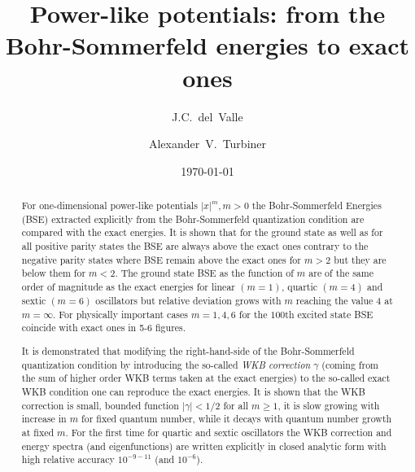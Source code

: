 \documentclass[preprint,preprintnumbers,amsmath,amssymb]{revtex4}
\begin{document}
\title{Power-like potentials: from the Bohr-Sommerfeld energies to exact ones}

\date{\today}

%
\author{J.C.~del~Valle}
%
\author{Alexander~V.~Turbiner}
%

\begin{abstract}
For one-dimensional power-like potentials $|x|^m, m > 0$ the Bohr-Sommerfeld Energies (BSE) extracted explicitly from the Bohr-Sommerfeld quantization condition are compared with the exact energies. It is shown that for the ground state as well as for all positive parity states the BSE are always above the exact ones contrary to the negative parity states where BSE remain above the exact ones for $m>2$ but they are below them for $m < 2$. The ground state BSE as the function of $m$ are of the same order of magnitude as
the exact energies for linear $(m=1)$, quartic $(m=4)$ and sextic $(m=6)$ oscillators but relative deviation grows with $m$ reaching the value 4 at $m=\infty$. For physically important cases $m=1,4,6$ for the $100$th excited state BSE coincide with exact ones in 5-6 figures.

It is demonstrated that modifying the right-hand-side of the Bohr-Sommerfeld quantization condition by introducing the so-called {\it WKB correction} $\gamma$ (coming from the sum of higher order WKB terms taken at the exact energies) to the so-called exact WKB condition one can reproduce the exact energies. It is shown that the WKB correction is small, bounded function $|\gamma| < 1/2$ for all $m \geq 1$, it is slow growing with increase in $m$ for fixed quantum number, while it decays with quantum number growth at fixed $m$. For the first time for quartic and sextic oscillators the WKB correction and energy spectra (and eigenfunctions) are written explicitly in closed analytic form with high relative accuracy $10^{-9-11}$ (and $10^{-6}$).

\end{abstract}

\maketitle
\end{document}
